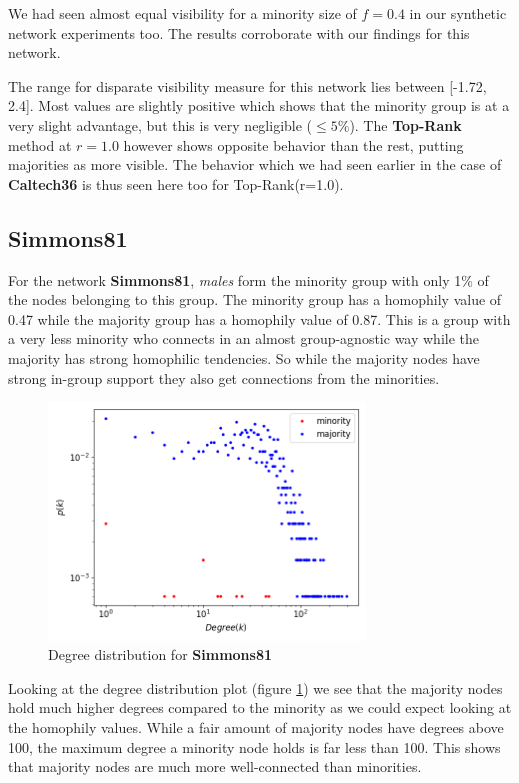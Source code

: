 We had seen almost equal visibility for a minority size of $f=0.4$ in our synthetic network experiments too. The results corroborate with our findings for this network.

The range for disparate visibility measure for this network lies between [-1.72, 2.4]. Most values are slightly positive which shows that the minority group is at a very slight advantage, but this is very negligible ($\leq 5\%$). The \textbf{Top-Rank} method at $r=1.0$ however shows opposite behavior than the rest, putting majorities as more visible. The behavior which we had seen earlier in the case of \textbf{Caltech36} is thus seen here too for Top-Rank(r=1.0).

\subsection{Simmons81}

For the network \textbf{Simmons81}, \textit{males} form the minority group with only 1\% of the nodes belonging to this group. The minority group has a homophily value of 0.47 while the majority group has a homophily value of 0.87. This is a group with a very less minority who connects in an almost group-agnostic way while the majority has strong homophilic tendencies. So while the majority nodes have strong in-group support they also get connections from the minorities.

\begin{figure}
	\centering
	\includegraphics[trim=0 10 0 10, clip, width=0.75\textwidth]{images/dd_simmons.png}
	\caption{Degree distribution for \textbf{Simmons81}}
	\label{dd_simmons}
\end{figure}

Looking at the degree distribution plot (figure \ref{dd_simmons}) we see that the majority nodes hold much higher degrees compared to the minority as we could expect looking at the homophily values. While a fair amount of majority nodes have degrees above 100, the maximum degree a minority node holds is far less than 100. This shows that majority nodes are much more well-connected than minorities.

